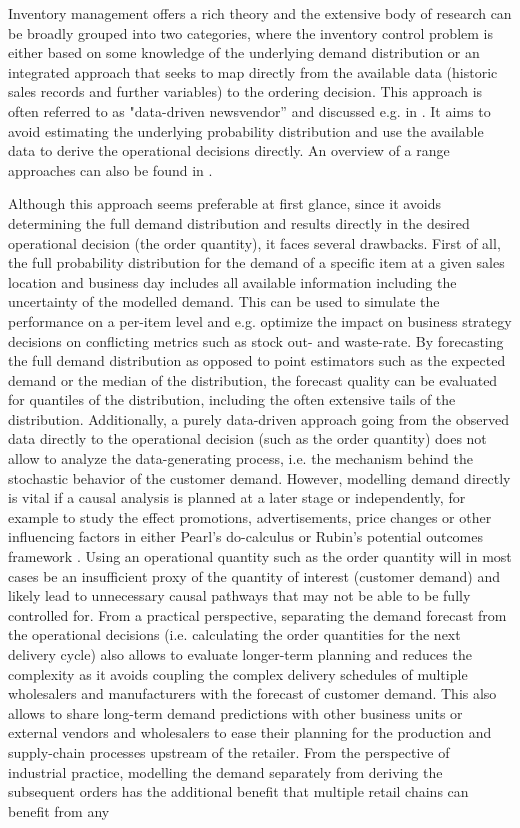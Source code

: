 \documentclass[BCOR=1mm, DIV=calc,10pt,
twoside=true,
twocolumn,
headings=normal]{scrartcl}
\begin{document}
Inventory management offers a rich theory and the extensive body of research can be broadly grouped into two categories, where the inventory control problem is either based on some knowledge of the underlying demand  distribution or an integrated approach that seeks to map directly from the available data (historic sales records and further variables) to the ordering decision. This approach is often referred to as "data-driven newsvendor'' and discussed  e.g. in \cite{beutel2012safety,ban2019big,bertsimas2020predictive, oroojlooyjadid2020applying}. It aims to avoid estimating the underlying probability distribution and use the available data to derive the operational decisions directly.  An overview of a range approaches can also be found in \cite{huber2019data}.

Although this approach seems preferable at first glance, since it avoids determining the full demand distribution and results directly in the desired operational decision (the order quantity), it faces several drawbacks. First of all, the full probability distribution for the demand of a specific item at a given sales location and business day includes all available information including the uncertainty of the modelled demand. This can be used to simulate the performance on a per-item level and e.g. optimize the impact on business strategy decisions on conflicting metrics such as stock out- and waste-rate. By forecasting the full demand distribution as opposed to point estimators such as the expected demand or the median of the distribution, the forecast quality can be evaluated for quantiles of the distribution, including the often extensive tails of the distribution. Additionally, a purely data-driven approach going from the observed data directly to the operational decision (such as the order quantity) does not allow to analyze the data-generating process, i.e. the mechanism behind the stochastic behavior of the customer demand. However, modelling demand directly is vital if a causal analysis is planned at a later stage or independently, for example to study the effect promotions, advertisements,  price changes or other influencing factors in either Pearl's do-calculus \cite{PearlCausality} or Rubin's potential outcomes framework \cite{rubin1974estimating}. Using an operational quantity such as the order quantity will in most cases be an insufficient proxy of the quantity of interest (customer demand) and likely lead to unnecessary causal pathways that may not be able to be fully controlled for. From a practical perspective, separating the demand forecast from the operational decisions (i.e. calculating the  order quantities for the next delivery cycle) also allows to evaluate longer-term planning and reduces the complexity as it avoids coupling the complex delivery schedules of multiple wholesalers and manufacturers with the forecast of customer demand. This also allows to share long-term demand predictions with other business units or external vendors  and wholesalers to ease their planning for the production and supply-chain processes upstream of the retailer. From the perspective of industrial practice, modelling the demand separately from deriving the subsequent orders  has the additional benefit that multiple retail chains can benefit from any 
\end{document}
